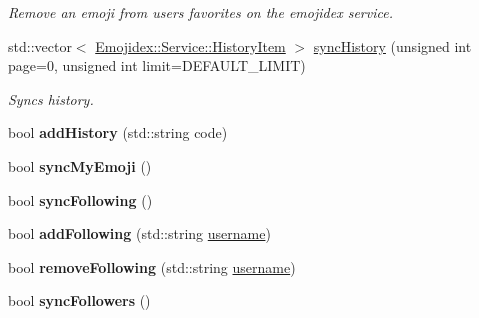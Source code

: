\begin{DoxyCompactItemize}
\begin{DoxyCompactList}\small\item\em Remove an emoji from users favorites on the emojidex service. \end{DoxyCompactList}\item 
std\+::vector$<$ \hyperlink{classEmojidex_1_1Service_1_1HistoryItem}{Emojidex\+::\+Service\+::\+History\+Item} $>$ \hyperlink{classEmojidex_1_1Service_1_1User_ae26cdfd2fbd24777a167709a615590d1}{sync\+History} (unsigned int page=0, unsigned int limit=D\+E\+F\+A\+U\+L\+T\+\_\+\+L\+I\+M\+IT)
\begin{DoxyCompactList}\small\item\em Syncs history. \end{DoxyCompactList}\item 
bool {\bfseries add\+History} (std\+::string code)\hypertarget{classEmojidex_1_1Service_1_1User_a5bf74092c95f3b6aca6a5f8dee857879}{}\label{classEmojidex_1_1Service_1_1User_a5bf74092c95f3b6aca6a5f8dee857879}

\item 
bool {\bfseries sync\+My\+Emoji} ()\hypertarget{classEmojidex_1_1Service_1_1User_acef94239cf65b7d8b707b688a8f0a4c9}{}\label{classEmojidex_1_1Service_1_1User_acef94239cf65b7d8b707b688a8f0a4c9}

\item 
bool {\bfseries sync\+Following} ()\hypertarget{classEmojidex_1_1Service_1_1User_a5d3d73e8788572961694cab846f5708a}{}\label{classEmojidex_1_1Service_1_1User_a5d3d73e8788572961694cab846f5708a}

\item 
bool {\bfseries add\+Following} (std\+::string \hyperlink{classEmojidex_1_1Service_1_1User_a5bb9d033735aa9f82fa666f811f48743}{username})\hypertarget{classEmojidex_1_1Service_1_1User_ad0e6e27ef16bc37e1839d2deda9f8744}{}\label{classEmojidex_1_1Service_1_1User_ad0e6e27ef16bc37e1839d2deda9f8744}

\item 
bool {\bfseries remove\+Following} (std\+::string \hyperlink{classEmojidex_1_1Service_1_1User_a5bb9d033735aa9f82fa666f811f48743}{username})\hypertarget{classEmojidex_1_1Service_1_1User_a42f548583cb236e22278754c863ea6c6}{}\label{classEmojidex_1_1Service_1_1User_a42f548583cb236e22278754c863ea6c6}

\item 
bool {\bfseries sync\+Followers} ()\hypertarget{classEmojidex_1_1Service_1_1User_ac9d62c8a7fd9eb6e64e930460e9f98d3}{}\label{classEmojidex_1_1Service_1_1User_ac9d62c8a7fd9eb6e64e930460e9f98d3}

\end{DoxyCompactItemize}
